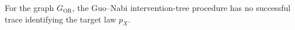 For the graph \(G_{\mathrm{OR}}\), the Guo--Nabi intervention-tree procedure has no successful trace identifying the target law \(p_X\).
